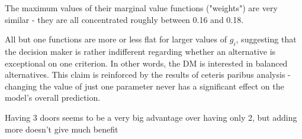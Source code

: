 \documentclass[../main.tex]{subfiles}
\begin{document}
The maximum values of their marginal value functions ("weights")
are very similar - they are all concentrated roughly between 0.16 and 0.18.

All but one functions are more or less flat for larger values of $g_i$, suggesting
that the decision maker is rather indifferent regarding whether an alternative is
exceptional on one criterion. In other words, the DM is interested in balanced alternatives.
This claim is reinforced by the results of ceteris paribus analysis -
changing the value of just one parameter never has a significant effect on
the model's overall prediction.

Having 3 doors seems to be a very big advantage over having only 2,
but adding more doesn't give much benefit


\end{document}
